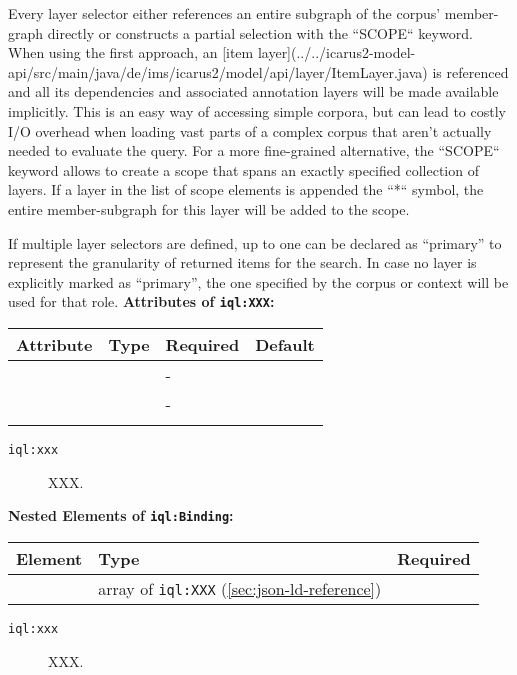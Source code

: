 \documentclass[11pt]{article}
\newcommand{\iqlns}{iql:}
\newcommand{\iqlType}[1]{\texttt{\iqlns#1}}
\newcommand{\attributes}[1]{\noindent\textbf{Attributes of \iqlType{#1}:}\newline\medskip}
\newcommand{\elements}[1]{\noindent\textbf{Nested Elements of \iqlType{#1}:}\newline\medskip}
\begin{document}
Every layer selector either references an entire subgraph of the corpus' member-graph directly or constructs a partial selection with the ``SCOPE`` keyword. When using the first approach, an [item layer](../../icarus2-model-api/src/main/java/de/ims/icarus2/model/api/layer/ItemLayer.java) is referenced and all its dependencies and associated annotation layers will be made available implicitly. This is an easy way of accessing simple corpora, but can lead to costly I/O overhead when loading vast parts of a complex corpus that aren't actually needed to evaluate the query. For a more fine-grained alternative, the ``SCOPE`` keyword allows to create a scope that spans an exactly specified collection of layers. If a layer in the list of scope elements is appended the ``*`` symbol, the entire member-subgraph for this layer will be added to the scope.

If multiple layer selectors are defined, up to one can be declared as ``primary'' to represent the granularity of returned items for the search.
In case no layer is explicitly marked as ``primary'', the one specified by the corpus or context will be used for that role.
\attributes{XXX}
\begin{tabular}{|p{}|p{}|p{}|p{}|}
	\hline
	\textbf{Attribute} & \textbf{Type} & \textbf{Required} & \textbf{Default} \\ 
	\hline
	\hline
	&  & - &  \\ 
	\hline 
	&  & - &  \\ 
	\hline 
	&  &  & \\ 
	\hline 
\end{tabular}
\begin{description}
	\item[\iqlType{xxx}] XXX.
\end{description}
\elements{Binding}
\begin{tabular}{|p{}|p{}|p{}|}
	\hline
	\textbf{Element} & \textbf{Type} & \textbf{Required} \\ 
	\hline
	\hline 
	& array of \iqlType{XXX} (\ref{sec:json-ld-reference}) &  \\ 
	\hline 
\end{tabular}
\begin{description}
	\item[\iqlType{xxx}] XXX.
\end{description}

\end{document}
